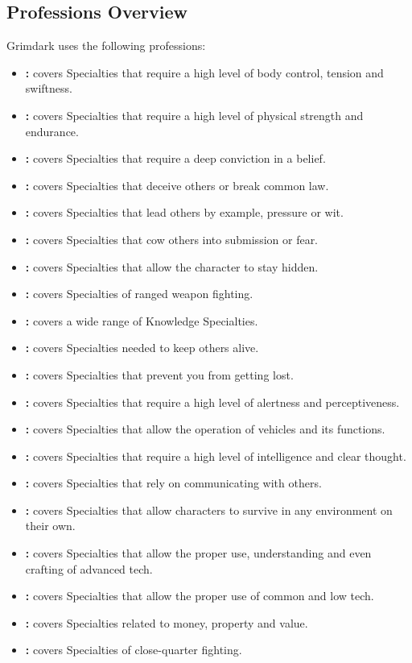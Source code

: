 \subsection{Professions Overview}
Grimdark uses the following professions:
\begin{itemize}
	\item \textbf{:} covers Specialties that require a high level of body control, tension and swiftness.
	\item \textbf{:} covers Specialties that require a high level of physical strength and endurance.
	\item \textbf{:} covers Specialties that require a deep conviction in a belief.
	\item \textbf{:} covers Specialties that deceive others or break common law.
	\item \textbf{:} covers Specialties that lead others by example, pressure or wit.
	\item \textbf{:} covers Specialties that cow others into submission or fear.
	\item \textbf{:} covers Specialties that allow the character to stay hidden.
	\item \textbf{:} covers Specialties of ranged weapon fighting.
	\item \textbf{:} covers a wide range of Knowledge Specialties.
	\item \textbf{:} covers Specialties needed to keep others alive.
	\item \textbf{:} covers Specialties that prevent you from getting lost.
	\item \textbf{:} covers Specialties that require a high level of alertness and perceptiveness.
	\item \textbf{:} covers Specialties that allow the operation of vehicles and its functions.
	\item \textbf{:} covers Specialties that require a high level of intelligence and clear thought.
	\item \textbf{:} covers Specialties that rely on communicating with others.
	\item \textbf{:} covers Specialties that allow characters to survive in any environment on their own.
	\item \textbf{:} covers Specialties that allow the proper use, understanding and even crafting of advanced tech.
	\item \textbf{:} covers Specialties that allow the proper use of common and low tech.
	\item \textbf{:} covers Specialties related to money, property and value.
	\item \textbf{:} covers Specialties of close-quarter fighting.
\end{itemize}

